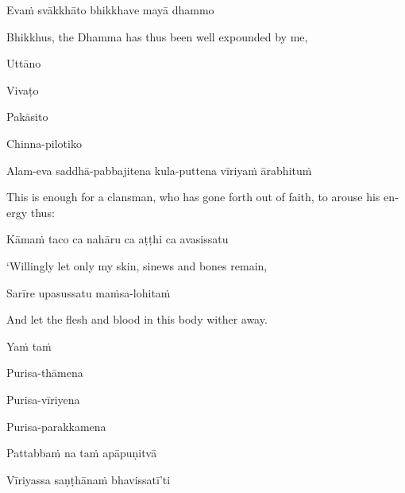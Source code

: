 \begin{leader}
\end{leader}

Evaṁ svākkhāto bhikkhave mayā dhammo

\begin{english}
  Bhikkhus, the Dhamma has thus been well expounded by me,
\end{english}

Uttāno


Vivaṭo


Pakāsito


Chinna-pilotiko


Alam-eva saddhā-pabbajitena kula-puttena vīriyaṁ ārabhituṁ

\begin{english}
  This is enough for a clansman, who has gone forth out of faith,
  to arouse his energy thus:
\end{english}

Kāmaṁ taco ca nahāru ca aṭṭhi ca avasissatu

\begin{english}
  `Willingly let only my skin, sinews and bones remain,
\end{english}

Sarīre upasussatu maṁsa-lohitaṁ

\begin{english}
  And let the flesh and blood in this body wither away.
\end{english}

Yaṁ taṁ


Purisa-thāmena


Purisa-vīriyena


Purisa-parakkamena


Pattabbaṁ na taṁ apāpuṇitvā


Vīriyassa saṇṭhānaṁ bhavissatī'ti

